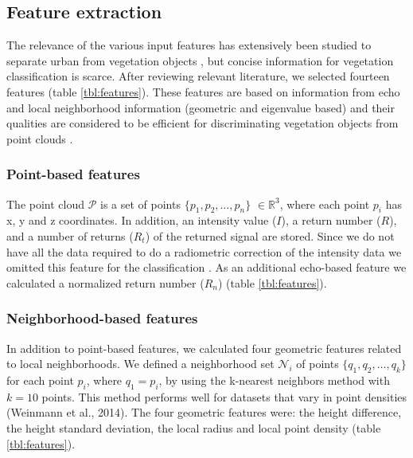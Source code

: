 \subsection{Feature extraction}

The relevance of the various input features has extensively been studied to separate urban from vegetation objects \citep{chehata2009airborne, guo2011relevance, mallet2011relevance}, but concise information for vegetation classification is scarce. After reviewing relevant literature, we selected fourteen features (table \ref{tbl:features}). These features are based on information from echo and local neighborhood information (geometric and eigenvalue based) and their qualities are considered to be efficient for discriminating vegetation objects from point clouds \citep{chehata2009airborne}.

\subsubsection{Point-based features}
The point cloud \(\mathcal{P}\) is a set of points \(\{p_{1}, p_{2}, \dots, p_{n}\}\) \(\in \mathbb{R}^3\), where each point \(p_{i}\) has x, y and z coordinates. In addition, an intensity value (\(I\)), a return number (\(R\)), and a number of returns (\(R_{t}\)) of the returned signal are stored. Since we do not have all the data required to do a radiometric correction of the intensity data we omitted this feature for the classification \citep{kashani2015review}. As an additional echo-based feature we calculated a normalized return number (\(R_{n}\)) (table \ref{tbl:features}).

\subsubsection{Neighborhood-based features}
In addition to point-based features, we calculated four geometric features related to local neighborhoods. We defined a neighborhood set \(\mathcal{N}_{i}\) of points \(\{q_{1}, q_{2}, \dots, q_{k}\}\) for each point \(p_{i}\), where \(q_{1} = p_{i}\), by using the k-nearest neighbors method with \(k = 10\) points. This method performs well for datasets that vary in point densities (Weinmann et al., 2014). The four geometric features were: the height difference, the height standard deviation, the local radius and local point density (table \ref{tbl:features}).

